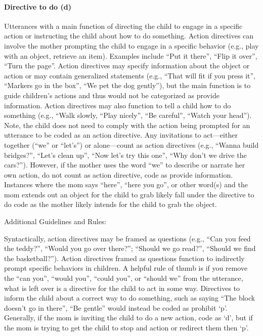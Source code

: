 \documentclass[
]{book}
\begin{document}
\hypertarget{directive_to_do}{%
\paragraph*{Directive to do (d)}\label{directive_to_do}}

Utterances with a main function of directing the child to engage in a specific action or instructing the child about how to do something. Action directives can involve the mother prompting the child to engage in a specific behavior (e.g., play with an object, retrieve an item). Examples include ``Put it there'', ``Flip it over'', ``Turn the page''.
Action directives may specify information about the object or action or may contain generalized statements (e.g., ``That will fit if you press it'', ``Markers go in the box'', ``We pet the dog gently''), but the main function is to guide children's actions and thus would not be categorized as provide information. Action directives may also function to tell a child how to do something (e.g., ``Walk slowly, ``Play nicely'', ``Be careful'', ``Watch your head''). Note, the child does not need to comply with the action being prompted for an utterance to be coded as an action directive.
Any invitations to act---either together (``we'' or ``let's'') or alone---count as action directives (e.g., ``Wanna build bridges?'', ``Let's clean up'', ``Now let's try this one'', ``Why don't we drive the cars?''). However, if the mother uses the word ``we'' to describe or narrate her own action, do not count as action directive, code as provide information.
Instances where the mom says ``here'', ``here you go'', or other word(s) and the mom extends out an object for the child to grab likely fall under the directive to do code as the mother likely intends for the child to grab the object.

Additional Guidelines and Rules:

Syntactically, action directives may be framed as questions (e.g., ``Can you feed the teddy?'', ``Would you go over there?''; ``Should we go read?'', ``Should we find the basketball?''). Action directives framed as questions function to indirectly prompt specific behaviors in children. A helpful rule of thumb is if you remove the ``can you'', ``would you'', ``could you'', or ``should we'' from the utterance, what is left over is a directive for the child to act in some way.
Directives to inform the child about a correct way to do something, such as saying ``The block doesn't go in there'', ``Be gentle'' would instead be coded as prohibit `p'. Generally, if the mom is inviting the child to do a new action, code as `d', but if the mom is trying to get the child to stop and action or redirect them then `p'.
\end{document}
